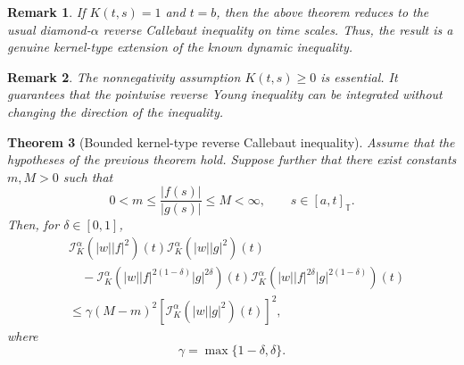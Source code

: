 \documentclass[11pt]{article}
\newtheorem{theorem}{Theorem}[section]
\newtheorem{remark}[theorem]{Remark}
\begin{document}
\begin{remark}
If $K(t,s)=1$ and $t=b$, then the above theorem reduces to the usual
diamond-$\alpha$ reverse Callebaut inequality on time scales. Thus, the result
is a genuine kernel-type extension of the known dynamic inequality.
\end{remark}

\begin{remark}
The nonnegativity assumption $K(t,s)\geq0$ is essential. It guarantees that the
pointwise reverse Young inequality can be integrated without changing the
direction of the inequality.
\end{remark}

\begin{theorem}[Bounded kernel-type reverse Callebaut inequality]
Assume that the hypotheses of the previous theorem hold. Suppose further that
there exist constants $m,M>0$ such that
\[
    0<m\leq \frac{|f(s)|}{|g(s)|}\leq M<\infty,
    \qquad s\in[a,t]_{\mathbb{T}}.
\]
Then, for $\delta\in[0,1]$,
\[
\begin{aligned}
&
\mathcal{I}_{K}^{\alpha}(|w||f|^2)(t)
\mathcal{I}_{K}^{\alpha}(|w||g|^2)(t)                                      \\
&\quad -
\mathcal{I}_{K}^{\alpha}
\left(|w||f|^{2(1-\delta)}|g|^{2\delta}\right)(t)
\mathcal{I}_{K}^{\alpha}
\left(|w||f|^{2\delta}|g|^{2(1-\delta)}\right)(t)                            \\
&\leq
\gamma(M-m)^2
\left[
\mathcal{I}_{K}^{\alpha}(|w||g|^2)(t)
\right]^2,
\end{aligned}
\]
where
\[
    \gamma=\max\{1-\delta,\delta\}.
\]
\end{theorem}
\end{document}
